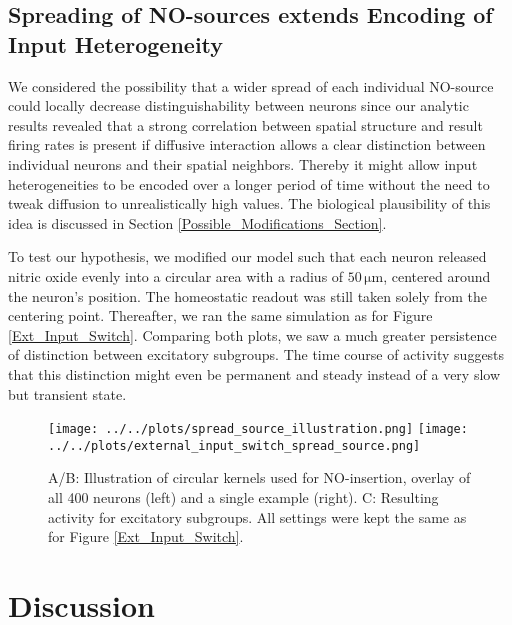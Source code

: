 \documentclass[10pt,a4paper]{article}
\begin{document}
\newpage
\subsection{Spreading of NO-sources extends Encoding of Input Heterogeneity}
We considered the possibility that a wider spread of each individual NO-source could locally decrease distinguishability between neurons since our analytic results revealed that a strong correlation between spatial structure and result firing rates is present if diffusive interaction allows a clear distinction between individual neurons and their spatial neighbors. Thereby it might allow input heterogeneities to be encoded over a longer period of time without the need to tweak diffusion to unrealistically high values. The biological plausibility of this idea is discussed in Section \ref{Possible_Modifications_Section}.

To test our hypothesis, we modified our model such that each neuron released nitric oxide evenly into a circular area with a radius of $\mathrm{50 \, \mu m}$, centered around the neuron's position. The homeostatic readout was still taken solely from the centering point. Thereafter, we ran the same simulation as for Figure \ref{Ext_Input_Switch}. Comparing both plots, we saw a much greater persistence of distinction between excitatory subgroups. The time course of activity suggests that this distinction might even be permanent and steady instead of a very slow but transient state.
\begin{figure}
\texttt{[image: ../../plots/spread\_source\_illustration.png]}
\texttt{[image: ../../plots/external\_input\_switch\_spread\_source.png]}
\caption{A/B: Illustration of circular kernels used for NO-insertion, overlay of all 400 neurons (left) and a single example (right). C: Resulting activity for excitatory subgroups. All settings were kept the same as for Figure \ref{Ext_Input_Switch}.}
\label{External_Input_Switch_Spread_Source}
\end{figure}


\section{Discussion}
\end{document}
